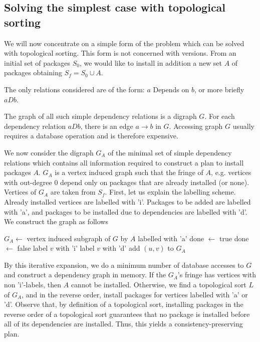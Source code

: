 \documentclass[a4paper,11pt]{article}
\begin{document}
\subsection{Solving the simplest case with topological sorting}

We will now concentrate on a simple form of the problem which can be
solved with topological sorting. This form is not concerned with
versions. From an initial set of packages $S_0$, we would like to
install in addition a new set $A$ of packages obtaining $S_f = S_0 \cup
A$.

The only relations considered are of the form: $a$ Depends on $b$, or more
briefly $aDb$.

The graph of all such simple dependency relations is a digraph $G$.
For each dependency relation $aDb$, there is an edge $a \to b$ in $G$.
Accessing graph $G$ usually requires a database operation and is
therefore expensive.

We now consider the digraph $G_A$ of the minimal set of simple
dependency relations which contains all information required to
construct a plan to install packages $A$. $G_A$ is a vertex induced
graph such that the fringe of $A$, e.g. vertices with out-degree $0$
depend only on packages that are already installed (or none). Vertices
of $G_A$ are taken from $S_f$. First, let us explain the labelling
scheme.  Already installed vertices are labelled with 'i'. Packages to
be added are labelled with 'a', and packages to be installed due to
dependencies are labelled with 'd'. We construct the graph as follows
\begin{algorithm}
  \caption{$\textsc{Make-}G_A(G, A)$}
  \label{alg:cons-graph}
  \begin{algorithmic}[1]
\STATE $G_A \gets$ vertex induced subgraph of $G$ by $A$ labelled with 'a'
\REPEAT
  \STATE done $\gets$ true
        \STATE done $\gets$ false
          \STATE label $v$ with 'i'
        \ELSE
          \STATE label $v$ with 'd'
        \ENDIF
        \STATE add $(u,v)$ to $G_A$
       \ENDIF
     \ENDFOR
  \ENDFOR
{}
\end{algorithmic}
\end{algorithm}

By this iterative expansion, we do a minimum number of database
accesses to $G$ and construct a dependency graph in memory. If the
$G_A$'s fringe has vertices with non 'i'-labels, then $A$ cannot be
installed. Otherwise, we find a topological sort $L$ of $G_A$, and in
the reverse order, install packages for vertices labelled with
'a' or 'd'. Observe that, by definition of a topological sort,
installing packages in the reverse order of a topological sort
guarantees that no package is installed before all of its dependencies
are installed. Thus, this yields a consistency-preserving plan.
\end{document}
